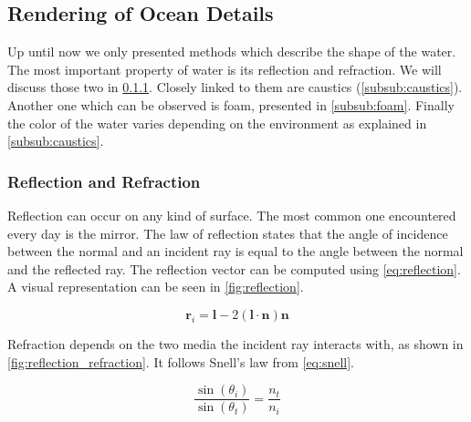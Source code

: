 \subsection{Rendering of Ocean Details}\label{subsec:ocean_details}


Up until now we only presented methods which describe the shape of the water.
The most important property of water is its reflection and refraction. We will
discuss those two in \cref{subsub:reflection_refraction}. Closely linked to them
are caustics (\cref{subsub:caustics}). Another one which can be observed is
foam, presented in \cref{subsub:foam}. Finally the color of the water varies
depending on the environment as explained in \cref{subsub:caustics}.

\subsubsection{Reflection and Refraction}\label{subsub:reflection_refraction}

Reflection can occur on any kind of surface. The most common one encountered
every day is the mirror. The law of reflection states that the angle of
incidence between the normal and an incident ray is equal to the angle between
the normal and the reflected ray. The reflection vector can be computed using
\autoref{eq:reflection}. A visual representation can be seen in
\autoref{fig:reflection}.

\begin{equation}\label{eq:reflection}
    \textbf{r}_{i} = \textbf{l} - 2(\textbf{l} \cdot
    \textbf{n})\textbf{n}
\end{equation}

Refraction depends on the two media the incident ray interacts with, as shown in
\autoref{fig:reflection_refraction}. It follows Snell's law from
\autoref{eq:snell}. 

\begin{equation}\label{eq:snell}
    \frac{\sin(\theta_i)}{\sin(\theta_t)} ={} \frac{n_t}{n_i}
\end{equation}

